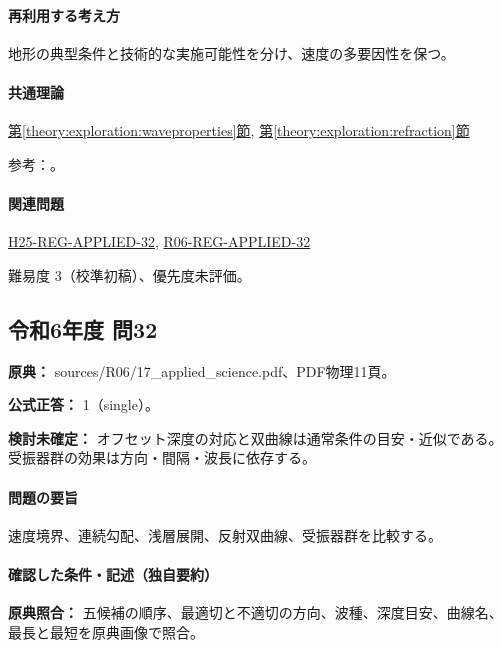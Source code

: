 \paragraph{再利用する考え方} 地形の典型条件と技術的な実施可能性を分け、速度の多要因性を保つ。

\paragraph{共通理論} \hyperref[theory:exploration:waveproperties]{第\ref*{theory:exploration:waveproperties}節}, \hyperref[theory:exploration:refraction]{第\ref*{theory:exploration:refraction}節}

\par 参考：\cite{jica_refraction2015,segj_integrated2017,usgs_refraction2013}。

\paragraph{関連問題} \hyperref[q:h25-reg-applied-32]{H25-REG-APPLIED-32}, \hyperref[q:r06-reg-applied-32]{R06-REG-APPLIED-32}

\par 難易度 3（校準初稿）、優先度未評価。

\subsection{令和6年度 問32}
\label{q:r06-reg-applied-32}

\noindent\textbf{原典：} sources/R06/17\_applied\_science.pdf、PDF物理11頁。

\textbf{公式正答：} 1（single）。

\par\textbf{検討未確定：} オフセット深度の対応と双曲線は通常条件の目安・近似である。受振器群の効果は方向・間隔・波長に依存する。

\paragraph{問題の要旨} 速度境界、連続勾配、浅層展開、反射双曲線、受振器群を比較する。

\paragraph{確認した条件・記述（独自要約）}\mbox{}\par

\noindent\textbf{原典照合：} 五候補の順序、最適切と不適切の方向、波種、深度目安、曲線名、最長と最短を原典画像で照合。\par


